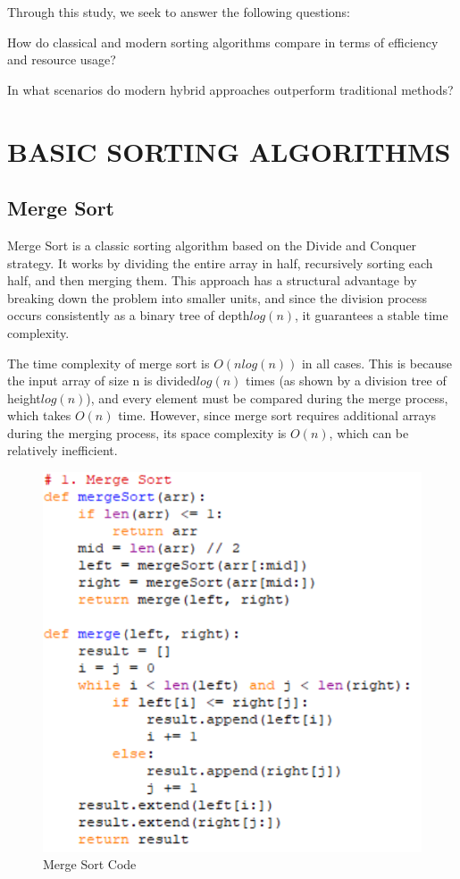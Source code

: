 \documentclass[sigconf]{acmart}
\begin{document}
Through this study, we seek to answer the following questions:

How do classical and modern sorting algorithms compare in terms of efficiency and resource usage?

In what scenarios do modern hybrid approaches outperform traditional methods?

\section{BASIC SORTING ALGORITHMS}
\subsection{Merge Sort}
Merge Sort is a classic sorting algorithm based on the Divide and Conquer strategy. It works by dividing the entire array in half, recursively sorting each half, and then merging them. This approach has a structural advantage by breaking down the problem into smaller units, and since the division process occurs consistently as a binary tree of depth$log(n)$, it guarantees a stable time complexity.

The time complexity of merge sort is $O(nlog(n))$ in all cases. This is because the input array of size n is divided$log(n)$ times (as shown by a division tree of height$log(n)$), and every element must be compared during the merge process, which takes $O(n)$ time. However, since merge sort requires additional arrays during the merging process, its space complexity is $O(n)$, which can be relatively inefficient.

\begin{figure}[t]
\centering
\includegraphics[width=0.85\linewidth]{figures/001.pdf}
\vspace{-0.3cm}
\caption{Merge Sort Code}  
\vspace{-0.35cm}
\label{fig:proportion}
\end{figure}
\end{document}
